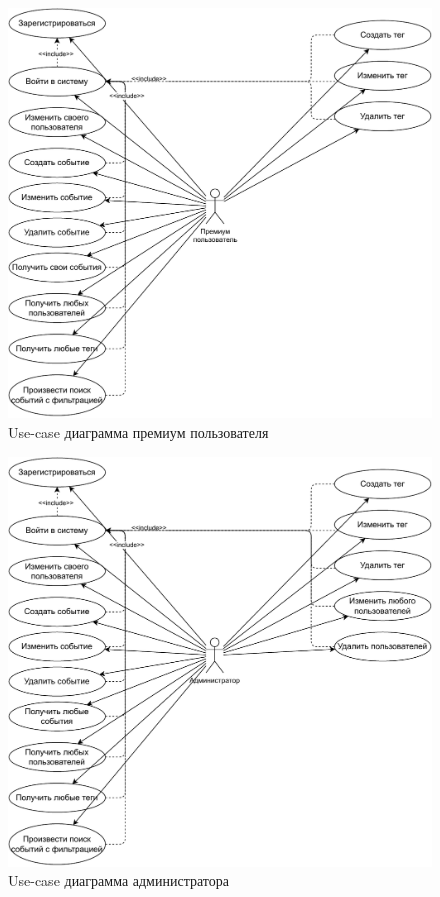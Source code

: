 \begin{figure}[ht!]
	\centering
	\includegraphics[width=0.9\linewidth]{assets/images/Use-Case-Премиум.pdf}
	\caption{Use-case диаграмма премиум пользователя}
	\label{fig:use-case-premium}
\end{figure}

\begin{figure}[ht!]
	\centering
	\includegraphics[width=0.9\linewidth]{assets/images/Use-Case-Администратор.pdf}
	\caption{Use-case диаграмма администратора}
	\label{fig:use-case-admin}
\end{figure}
\FloatBarrier


